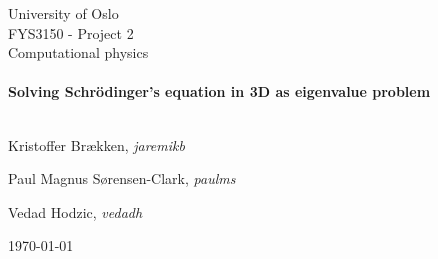 
\begin{center}
    \LARGE University of Oslo\\[1.5cm]
    \Large FYS3150 - Project 2 \\ Computational physics\\[0.5cm]

    \HRule \\[0.4cm]

    { \huge \bfseries Solving Schrödinger's equation in 3D as
    eigenvalue problem\\[0.4cm] }

    \HRule \\[1.5cm]

    \large Kristoffer Brækken, \emph{jaremikb}

    \large Paul Magnus Sørensen-Clark, \emph{paulms}

    \large Vedad Hodzic, \emph{vedadh}

    \vfill

    {\large \today}
\end{center}
